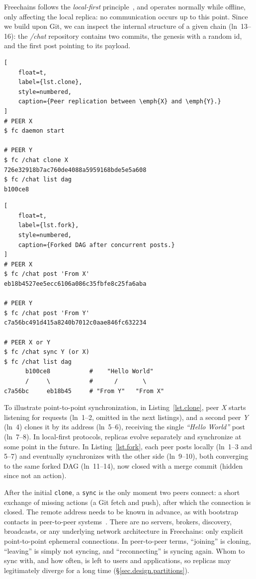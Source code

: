 \documentclass[10pt,twocolumn]{article}
\newcommand{\FC}       {Freechains\xspace}
\newcommand{\code}[1]  {\texttt{\small{#1}}}
\begin{document}
\FC follows the \emph{local-first} principle~\cite{p2p.local}, and operates
normally while offline, only affecting the local replica: no communication
occurs up to this point.
Since we build upon Git, we can inspect the internal structure of a given
chain (ln~13--16): the \emph{/chat} repository contains two commits, the
genesis with a random id, and the first post pointing to its payload.

\begin{lstlisting}[
    float=t,
    label={lst.clone},
    style=numbered,
    caption={Peer replication between \emph{X} and \emph{Y}.}
]
# PEER X
$ fc daemon start

# PEER Y
$ fc /chat clone X
726e32918b7ac760de4088a5959168bde5e5a608
$ fc /chat list dag
b100ce8
\end{lstlisting}

\begin{lstlisting}[
    float=t,
    label={lst.fork},
    style=numbered,
    caption={Forked DAG after concurrent posts.}
]
# PEER X
$ fc /chat post 'From X'
eb18b4527ee5ecc6106a086c35fbfe8c25fa6aba

# PEER Y
$ fc /chat post 'From Y'
c7a56bc491d415a8240b7012c0aae846fc632234

# PEER X or Y
$ fc /chat sync Y (or X)
$ fc /chat list dag
      b100ce8           #    "Hello World"
      /     \           #      /       \
c7a56bc     eb18b45     # "From Y"   "From X"
\end{lstlisting}

To illustrate point-to-point synchronization, in Listing~\ref{lst.clone}, peer
\emph{X} starts listening for requests (ln~1--2, omitted in the next listings),
and a second peer \emph{Y} (ln~4) clones it by its address (ln~5--6), receiving
the single \emph{``Hello World''} post (ln~7--8).
%
In local-first protocols, replicas evolve separately and synchronize at some
point in the future.
In Listing~\ref{lst.fork}, each peer posts locally (ln~1--3 and 5--7) and
eventually synchronizes with the other side (ln~9--10), both converging to the
same forked DAG (ln~11--14), now closed with a merge commit (hidden since not
an action).

After the initial \code{clone}, a \code{sync} is the only moment two peers
connect: a short exchange of missing actions (a Git fetch and push), after
which the connection is closed.
The remote address needs to be known in advance, as with bootstrap contacts in
peer-to-peer systems~\cite{p2p.survey,p2p.scuttlebutt}.
There are no servers, brokers, discovery, broadcasts, or any underlying
network architecture in \FC: only explicit point-to-point ephemeral
connections.
In peer-to-peer terms, ``joining'' is cloning, ``leaving'' is simply not
syncing, and ``reconnecting'' is syncing again.
Whom to sync with, and how often, is left to users and applications, so
replicas may legitimately diverge for a long time
(\S\ref{sec.design.partitions}).
\end{document}
